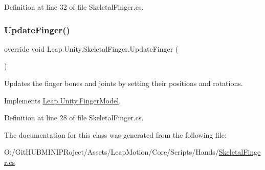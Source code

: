 Definition at line 32 of file Skeletal\+Finger.\+cs.

\mbox{\label{class_leap_1_1_unity_1_1_skeletal_finger_a8b622787258cd44d6cd4e20e8cb2a6a7}} 
\subsubsection{\texorpdfstring{UpdateFinger()}{UpdateFinger()}}
{\footnotesize\ttfamily override void Leap.\+Unity.\+Skeletal\+Finger.\+Update\+Finger (\begin{DoxyParamCaption}{ }\end{DoxyParamCaption})\hspace{0.3cm}{\ttfamily [virtual]}}

Updates the finger bones and joints by setting their positions and rotations. 

Implements \mbox{\hyperlink{class_leap_1_1_unity_1_1_finger_model_a9103f063172a8f99a9aa083407ada2a2}{Leap.\+Unity.\+Finger\+Model}}.



Definition at line 28 of file Skeletal\+Finger.\+cs.



The documentation for this class was generated from the following file\+:\begin{DoxyCompactItemize}
\item 
O\+:/\+Git\+H\+U\+B\+M\+I\+N\+I\+P\+Roject/\+Assets/\+Leap\+Motion/\+Core/\+Scripts/\+Hands/\mbox{\hyperlink{_skeletal_finger_8cs}{Skeletal\+Finger.\+cs}}\end{DoxyCompactItemize}
